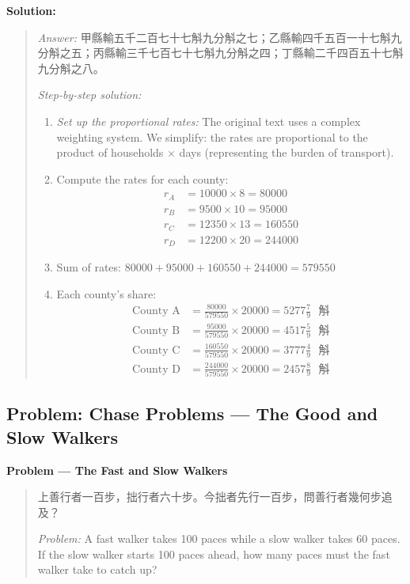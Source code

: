 \documentclass[11pt,a4paper]{article}
\newcommand{\zh}[1]{{#1}}
\newenvironment{chproblem}[1][]{%
  \par\medskip\noindent\textbf{\textcolor{sectioncolor}{#1}}\par\nopagebreak
  \begin{quote}\small
}{%
  \end{quote}\medskip
}
\newenvironment{chsolution}{%
  \par\medskip\noindent\textbf{\textcolor{notecolor}{Solution:}}\par\nopagebreak
  \begin{quote}\small
}{%
  \end{quote}\medskip
}
\newenvironment{stepbystep}{%
  \par\smallskip\noindent\textit{Step-by-step solution:}\par\nopagebreak
  \begin{enumerate}[leftmargin=2em,label=\textbf{Step \arabic*:},ref=\arabic*]
}{%
  \end{enumerate}\medskip
}
\begin{document}
\begin{chsolution}
\textit{Answer:} \zh{甲縣輸五千二百七十七斛九分斛之七；乙縣輸四千五百一十七斛九分斛之五；丙縣輸三千七百七十七斛九分斛之四；丁縣輸二千四百五十七斛九分斛之八。}

\begin{stepbystep}
\item \textit{Set up the proportional rates:} The original text uses a
complex weighting system. We simplify: the rates are proportional to the
product of households $\times$ days (representing the burden of transport).

\item Compute the rates for each county:
\begin{align*}
r_A &= 10000 \times 8 = 80000 \\
r_B &= 9500 \times 10 = 95000 \\
r_C &= 12350 \times 13 = 160550 \\
r_D &= 12200 \times 20 = 244000
\end{align*}

\item Sum of rates: $80000 + 95000 + 160550 + 244000 = 579550$

\item Each county's share:
\begin{align*}
\text{County A} &= \frac{80000}{579550} \times 20000 = 5277\tfrac{7}{9} \text{ \zh{斛}} \\
\text{County B} &= \frac{95000}{579550} \times 20000 = 4517\tfrac{5}{9} \text{ \zh{斛}} \\
\text{County C} &= \frac{160550}{579550} \times 20000 = 3777\tfrac{4}{9} \text{ \zh{斛}} \\
\text{County D} &= \frac{244000}{579550} \times 20000 = 2457\tfrac{8}{9} \text{ \zh{斛}}
\end{align*}
\end{stepbystep}
\end{chsolution}

\subsection{Problem: Chase Problems --- The Good and Slow Walkers}

\begin{chproblem}[Problem --- The Fast and Slow Walkers]
\zh{上善行者一百步，拙行者六十步。今拙者先行一百步，問善行者幾何步追及？}

\medskip
\textit{Problem:} A fast walker takes 100 paces while a slow walker takes 60
paces. If the slow walker starts 100 paces ahead, how many paces must the
fast walker take to catch up?
\end{chproblem}
\end{document}
